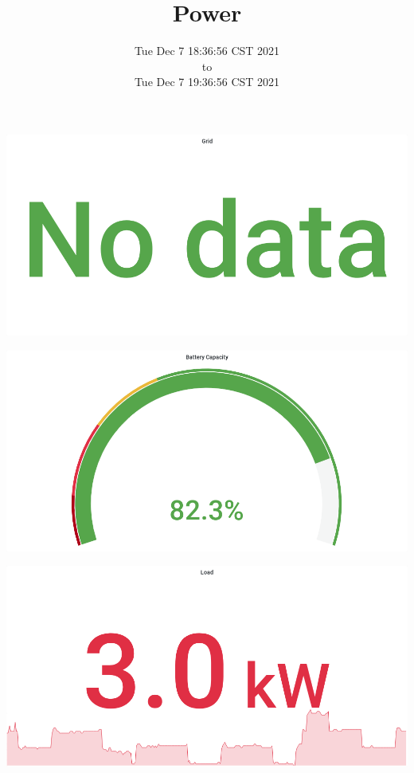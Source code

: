 \documentclass{article}
\begin{document}
\title{Power  }
\date{Tue Dec  7 18:36:56 CST 2021\\to\\Tue Dec  7 19:36:56 CST 2021}
\maketitle
\begin{center}
\par
\vspace{0.5cm}
\includegraphics[width=\textwidth]{image4}
\par
\vspace{0.5cm}
\par
\vspace{0.5cm}
\includegraphics[width=\textwidth]{image2}
\par
\vspace{0.5cm}
\par
\vspace{0.5cm}
\includegraphics[width=\textwidth]{image8}

\end{center}
\end{document}

